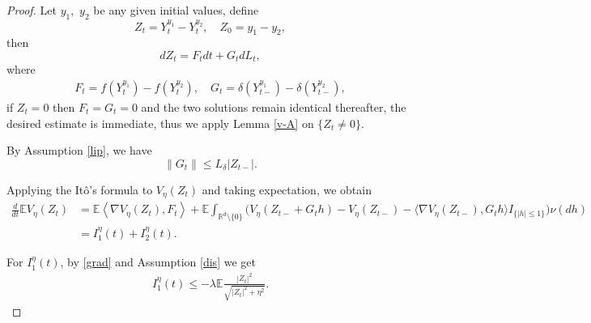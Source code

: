\documentclass[11pt,reqno]{amsart}
\numberwithin{equation}{section}
\begin{document}
\begin{proof}
	Let $y_1,$ $y_2$ be any given initial values, define
	$$	Z_t=Y_t^{y_1}-Y_t^{y_2}, \quad Z_0=y_1-y_2,$$
	then
	$$
	dZ_t=F_tdt+G_tdL_t,
	$$
	where 
	\begin{align*}
		F_t=f(Y_t^{y_1})-f(Y_t^{y_2}),\quad  G_t=\delta(Y_{t-}^{y_1})-\delta(Y_{t-}^{y_2}),	
	\end{align*}
if $Z_t=0$ then $F_t=G_t=0$ and the two solutions remain identical thereafter,
the desired estimate is immediate,  thus we apply
Lemma \ref{v-A} on $\{Z_t\neq0\}$.

	By Assumption \ref{lip}, we have
	\begin{equation}\label{G-est}
		\|G_t\|\leq L_\delta |Z_{t-}|.
	\end{equation}
	
	

	
Applying the It\^o's formula to
	$V_\eta(Z_t)$ and taking expectation, we obtain
	\begin{align*}
		\frac{d}{dt}\mathbb EV_\eta(Z_t)
		&=\mathbb E
		\left\langle\nabla V_\eta(Z_t),F_t
		\right\rangle+\mathbb E
		\int_{\mathbb R^{d}\setminus\{0\}}
		\Big(V_\eta(Z_{t-}+G_th)-V_\eta(Z_{t-})
		-\langle\nabla V_\eta(Z_{t-}),G_th\rangle I_{\{|h|\leq1\}}\Big)\nu(dh)\\
		&=I_1^\eta(t)+I_2^\eta(t).
	\end{align*}
	
	
	For $I_1^\eta(t)$,  by \eqref{grad} 
 and Assumption \ref{dis} we get
	\begin{align}\label{i1}
	I_1^\eta(t)
		\leq 	-\lambda
		\mathbb E
		\frac{|Z_t|^2}
		{\sqrt{|Z_t|^2+\eta^2}}.
	\end{align}
	

\end{proof}
\end{document}

